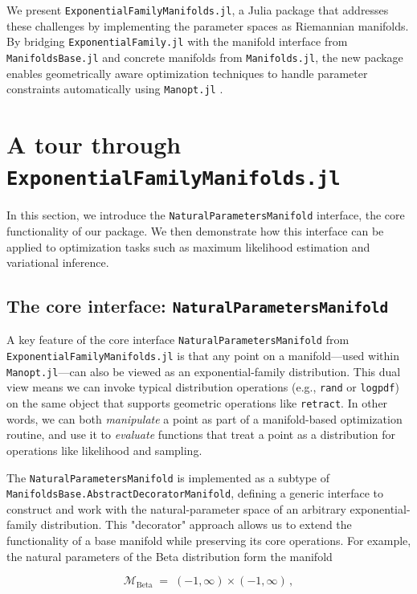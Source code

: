 \documentclass{juliacon}
\begin{document}
We present \texttt{ExponentialFamilyManifolds.jl}, a Julia \cite{bezanson2017julia} package that addresses these challenges by implementing the parameter spaces as Riemannian manifolds. By bridging \texttt{ExponentialFamily.jl} \cite{Senoz_ExponentialFamily_jl_2023} with the manifold interface from \texttt{ManifoldsBase.jl} \cite{axen_manifoldsjl_2023} and concrete manifolds from \texttt{Manifolds.jl}, the new package enables geometrically aware optimization techniques to handle parameter constraints automatically using \texttt{Manopt.jl} \cite{bergmann_manoptjl_2022}.

\section{A tour through \texttt{ExponentialFamilyManifolds.jl}}
In this section, we introduce the \texttt{NaturalParametersManifold} interface, the core functionality of our package. We then demonstrate how this interface can be applied to optimization tasks such as maximum likelihood estimation and variational inference.

\subsection{The core interface: \texttt{NaturalParametersManifold}}

A key feature of the core interface \texttt{NaturalParametersManifold} from \texttt{ExponentialFamilyManifolds.jl} is that any point on a manifold—used within \texttt{Manopt.jl}—can also be viewed as an exponential-family distribution. This dual view means we can invoke typical distribution operations (e.g., \texttt{rand} or \texttt{logpdf}) on the same object that supports geometric operations like \texttt{retract}. In other words, we can both \emph{manipulate} a point as part of a manifold-based optimization routine, and use it to \emph{evaluate} functions that treat a point as a distribution for operations like likelihood and sampling.

The \texttt{NaturalParametersManifold} is implemented as a subtype of \texttt{ManifoldsBase.AbstractDecoratorManifold}, defining a generic interface to construct and work with the natural-parameter space of an arbitrary exponential-family distribution. This "decorator" approach allows us to extend the functionality of a base manifold while preserving its core operations. For example, the natural parameters of the Beta distribution form the manifold

\[
\mathcal{M}_{\mathrm{Beta}} \;=\; (-1,\infty) \times (-1,\infty)\,,
\]
\end{document}
